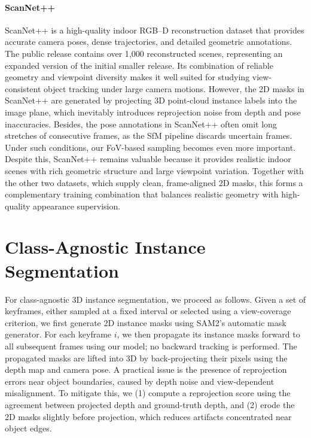 \paragraph{ScanNet++~\cite{yeshwanth2023scannet++}}
ScanNet++ is a high-quality indoor RGB--D reconstruction dataset that provides accurate camera poses, dense trajectories, and detailed geometric annotations.  
The public release contains over 1{,}000 reconstructed scenes, representing an expanded version of the initial smaller release\cite{yeshwanth2023scannet++}.  
Its combination of reliable geometry and viewpoint diversity makes it well suited for studying
view-consistent object tracking under large camera motions.
However, the 2D masks in ScanNet++ are generated by projecting 3D point-cloud instance labels into the image plane, which inevitably introduces reprojection noise from depth and pose inaccuracies. Besides, the pose annotations in ScanNet++ often omit long stretches of consecutive frames, as the SfM pipeline discards uncertain frames. Under such conditions, our FoV-based sampling becomes even more important.
Despite this, ScanNet++ remains valuable because it provides realistic indoor scenes with rich geometric structure and large viewpoint variation.  
Together with the other two datasets, which supply clean, frame-aligned 2D masks, this forms a complementary training combination that balances realistic geometry with high-quality appearance supervision.



\section{Class-Agnostic Instance Segmentation} \label{sec:class_agnostic}

For class-agnostic 3D instance segmentation, we proceed as follows.  
Given a set of keyframes, either sampled at a fixed interval or selected using a view-coverage criterion, we first generate 2D instance masks using SAM2’s automatic mask generator.  
For each keyframe $i$, we then propagate its instance masks forward to all subsequent frames using our model; no backward tracking is performed.
The propagated masks are lifted into 3D by back-projecting their pixels using the depth map and camera pose.  
A practical issue is the presence of reprojection errors near object boundaries, caused by depth noise and view-dependent misalignment.  
To mitigate this, we (1) compute a reprojection score using the agreement between projected depth and ground-truth depth, and (2) erode the 2D masks slightly before projection, which reduces artifacts concentrated near object edges.

